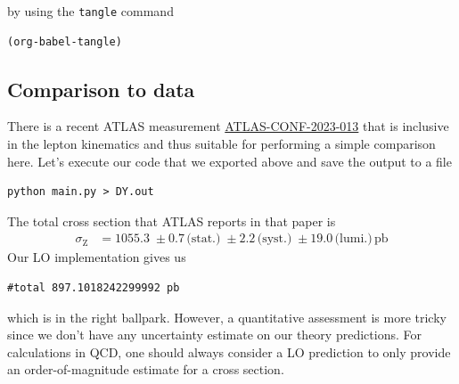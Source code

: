 \documentclass[11pt]{article}
\begin{document}
by using the \texttt{tangle} command
\begin{verbatim}
(org-babel-tangle)
\end{verbatim}

\subsection{Comparison to data}
\label{sec:org9cca00b}
There is a recent ATLAS measurement \href{https://atlas.web.cern.ch/Atlas/GROUPS/PHYSICS/CONFNOTES/ATLAS-CONF-2023-013/}{ATLAS-CONF-2023-013} that is inclusive in the lepton kinematics and thus suitable for performing a simple comparison here.
Let's execute our code that we exported above and save the output to a file
\begin{verbatim}
python main.py > DY.out
\end{verbatim}
The total cross section that ATLAS reports in that paper is
\begin{align}
  \sigma_\mathrm{Z}
  &=
  1055.3 \;\pm 0.7 \,\text{(stat.)} \;\pm 2.2 \,\text{(syst.)} \;\pm 19.0 \,\text{(lumi.)} \,\mathrm{pb}
\end{align}
Our LO implementation gives us
\begin{verbatim}
#total 897.1018242299992 pb
\end{verbatim}

which is in the right ballpark.
However, a quantitative assessment is more tricky since we don't have any uncertainty estimate on our theory predictions.
For calculations in QCD, one should always consider a LO prediction to only provide an order-of-magnitude estimate for a cross section.
\end{document}
